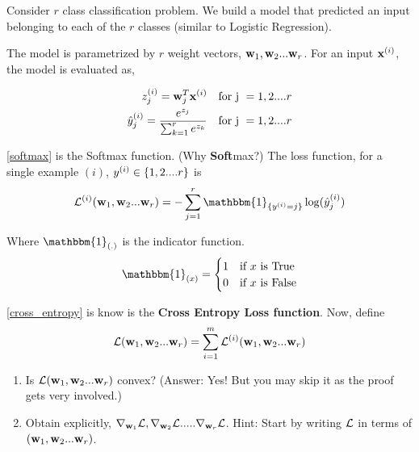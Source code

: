 Consider $r$ class classification problem. We build a model that predicted an input belonging to each of the $r$ classes (similar to Logistic Regression).

The model is parametrized by $r$ weight vectors, $\mathbf{w}_1, \mathbf{w}_2...\mathbf{w}_r$. For an input $\mathbf{x}^{(i)}$, the model is evaluated as,

\begin{align}
z_j^{(i)} = \mathbf{w}_j^T \mathbf{x}^{(i)} \ \ \text{ for j } = 1,2 ....r\\
\hat{y}^{(i)}_j = \frac{e^{z_j}}{\sum_{k = 1}^{r} e^{z_k}} \ \ \text{ for j } = 1,2 ....r\label{softmax}
\end{align}

\autoref{softmax} is the Softmax function. (Why \textbf{Soft}max?) The loss function, for a single example $(i)$, $y^{(i)} \in \{1,2....r\}$ is
\begin{equation}\label{cross_entropy}
    \loss^{(i)}(\wb_1, \wb_2...\wb_r) = -\sum_{j = 1}^{r} \mathbbm{1}_{\{\yieg = j\}} \log(\yhatieg_j)
\end{equation}

Where $\mathbbm{1}_{(.)}$ is the indicator function.
\[
\mathbbm{1}_{(x)} = 
\begin{cases} 
1 & \text{if } x \text{ is True} \\
0 & \text{if } x \text{ is False}
\end{cases}
\]

\autoref{cross_entropy} is know is the \textbf{Cross Entropy Loss function}. Now, define 
$$\mathcal{L}(\mathbf{w}_1, \mathbf{w}_2...\mathbf{w}_r) = \sum_{i = 1}^{m} \mathcal{L}^{(i)}(\mathbf{w}_1, \mathbf{w}_2...\mathbf{w}_r)$$

\begin{enumerate}[label=\alph*)]
\item  Is $\mathcal{L}(\mathbf{w}_1, \mathbf{w}_2...\mathbf{w}_r)$ convex? (Answer: Yes! But you may skip it as the proof gets very involved.)
\item Obtain explicitly, $\nabla_{\mathbf{w}_1} \mathcal{L}, \nabla_{\mathbf{w}_2} \mathcal{L}.....\nabla_{\mathbf{w}_r} \mathcal{L}$. Hint: Start by writing $\mathcal{L}$ in terms of $(\mathbf{w}_1, \mathbf{w}_2...\mathbf{w}_r)$.
\end{enumerate}
